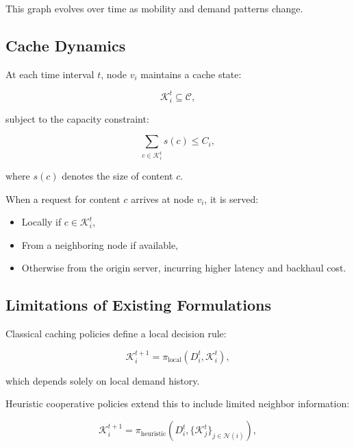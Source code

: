 This graph evolves over time as mobility and demand patterns change.

\subsection{Cache Dynamics}

At each time interval $t$, node $v_i$ maintains a cache state:

\begin{equation}
\mathcal{K}_i^t \subseteq \mathcal{C},
\end{equation}

subject to the capacity constraint:

\begin{equation}
\sum_{c \in \mathcal{K}_i^t} s(c) \leq C_i,
\end{equation}

where $s(c)$ denotes the size of content $c$.

When a request for content $c$ arrives at node $v_i$, it is served:

\begin{itemize}
    \item Locally if $c \in \mathcal{K}_i^t$,
    \item From a neighboring node if available,
    \item Otherwise from the origin server, incurring higher latency and backhaul cost.
\end{itemize}

\subsection{Limitations of Existing Formulations}

Classical caching policies define a local decision rule:

\begin{equation}
\mathcal{K}_i^{t+1} = \pi_{\text{local}}(D_i^t, \mathcal{K}_i^t),
\end{equation}

which depends solely on local demand history.

Heuristic cooperative policies extend this to include limited neighbor information:

\begin{equation}
\mathcal{K}_i^{t+1} =
\pi_{\text{heuristic}} \left( D_i^t, \{\mathcal{K}_j^t\}_{j \in \mathcal{N}(i)} \right),
\end{equation}

